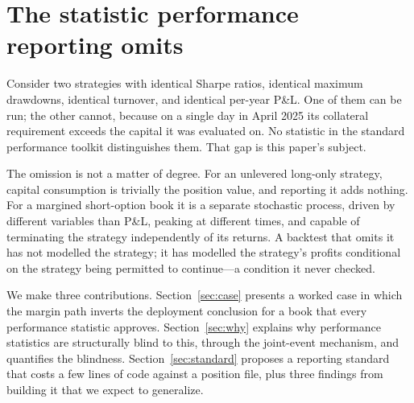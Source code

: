 \documentclass[11pt]{article}
\begin{document}
\begin{abstract}
ratio runs 6.7 to 16.1$\times$ across configurations while every performance statistic is a
moment of a single daily series. We propose a minimum reporting standard for margined
backtests---the dated requirement path, the peak's anatomy, an intrinsic-bound gap table on
actual daily inventory, and return on deployed margin alongside return on capital---and we
document three portable findings encountered in building it: a stale measurement window
understated the true peak two-and-a-half-fold; iron-condor netting cuts the peak requirement 15\% with
identical positions and P\&L, bounded by expiry alignment; and at small scale collateral is
usually not the binding constraint (signal supply is), so margin optimization pays exactly at
the scale-up where it stops being optional.
\end{abstract}

\section{The statistic performance reporting omits}
Consider two strategies with identical Sharpe ratios, identical maximum drawdowns, identical
turnover, and identical per-year P\&L. One of them can be run; the other cannot, because on a
single day in April 2025 its collateral requirement exceeds the capital it was evaluated
on. No
statistic in the standard performance toolkit distinguishes them. That gap is this paper's
subject.

The omission is not a matter of degree. For an unlevered long-only strategy, capital
consumption is trivially the position value, and reporting it adds nothing. For a margined
short-option book it is a separate stochastic process, driven by different variables than P\&L,
peaking at different times, and capable of terminating the strategy independently of its
returns. A backtest that omits it has not modelled the strategy; it has modelled the strategy's
profits conditional on the strategy being permitted to continue---a condition it never checked.

We make three contributions. Section~\ref{sec:case} presents a worked case in which the margin
path inverts the deployment conclusion for a book that every performance statistic approves.
Section~\ref{sec:why} explains why performance statistics are structurally blind to this,
through the joint-event mechanism, and quantifies the blindness. Section~\ref{sec:standard}
proposes a reporting standard that costs a few lines of code against a position file, plus
three findings from building it that we expect to generalize.
\end{document}
